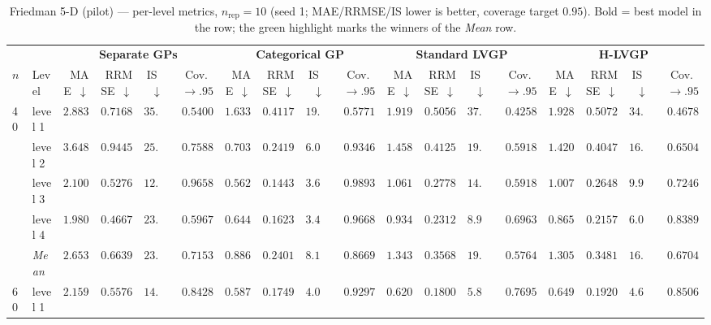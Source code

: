 \begin{table}[htbp]
\centering
\scriptsize
\setlength{\tabcolsep}{2.5pt}
\setlength{\fboxsep}{1pt}
\caption{Friedman 5-D (pilot) --- per-level metrics, $n_{\mathrm{rep}}=10$ (seed 1; MAE/RRMSE/IS lower is better, coverage target $0.95$). Bold = best model in the row; the green highlight marks the winners of the \emph{Mean} row.}
\label{tab:friedman_5d_nrep10}
\begin{tabular}{llrrrrrrrrrrrrrrrr}
\toprule
 & & \multicolumn{4}{c}{\textbf{Separate GPs}} & \multicolumn{4}{c}{\textbf{Categorical GP}} & \multicolumn{4}{c}{\textbf{Standard LVGP}} & \multicolumn{4}{c}{\textbf{H-LVGP}} \\
\cmidrule(lr){3-6} \cmidrule(lr){7-10} \cmidrule(lr){11-14} \cmidrule(lr){15-18}
$n$ & Level & MAE~$\downarrow$ & RRMSE~$\downarrow$ & IS~$\downarrow$ & Cov.~$\to.95$ & MAE~$\downarrow$ & RRMSE~$\downarrow$ & IS~$\downarrow$ & Cov.~$\to.95$ & MAE~$\downarrow$ & RRMSE~$\downarrow$ & IS~$\downarrow$ & Cov.~$\to.95$ & MAE~$\downarrow$ & RRMSE~$\downarrow$ & IS~$\downarrow$ & Cov.~$\to.95$ \\
\midrule
\multirow{5}{*}{40} & level 1 & $2.883$ & $0.7168$ & $35.53$ & $0.5400$ & {\boldmath$1.633$} & {\boldmath$0.4117$} & {\boldmath$19.32$} & {\boldmath$0.5771$} & $1.919$ & $0.5056$ & $37.19$ & $0.4258$ & $1.928$ & $0.5072$ & $34.30$ & $0.4678$ \\
 & level 2 & $3.648$ & $0.9445$ & $25.21$ & $0.7588$ & {\boldmath$0.7032$} & {\boldmath$0.2419$} & {\boldmath$6.049$} & {\boldmath$0.9346$} & $1.458$ & $0.4125$ & $19.22$ & $0.5918$ & $1.420$ & $0.4047$ & $16.31$ & $0.6504$ \\
 & level 3 & $2.100$ & $0.5276$ & $12.06$ & {\boldmath$0.9658$} & {\boldmath$0.5622$} & {\boldmath$0.1443$} & {\boldmath$3.628$} & $0.9893$ & $1.061$ & $0.2778$ & $14.27$ & $0.5918$ & $1.007$ & $0.2648$ & $9.959$ & $0.7246$ \\
 & level 4 & $1.980$ & $0.4667$ & $23.02$ & $0.5967$ & {\boldmath$0.6449$} & {\boldmath$0.1623$} & {\boldmath$3.434$} & {\boldmath$0.9668$} & $0.9341$ & $0.2312$ & $8.987$ & $0.6963$ & $0.8655$ & $0.2157$ & $6.081$ & $0.8389$ \\
 & \textit{Mean} & $2.653$ & $0.6639$ & $23.95$ & $0.7153$ & \colorbox{green!20}{\boldmath$0.8860$} & \colorbox{green!20}{\boldmath$0.2401$} & \colorbox{green!20}{\boldmath$8.108$} & \colorbox{green!20}{\boldmath$0.8669$} & $1.343$ & $0.3568$ & $19.92$ & $0.5764$ & $1.305$ & $0.3481$ & $16.66$ & $0.6704$ \\
\midrule
\multirow{5}{*}{60} & level 1 & $2.159$ & $0.5576$ & $14.19$ & $0.8428$ & {\boldmath$0.5879$} & {\boldmath$0.1749$} & {\boldmath$4.084$} & {\boldmath$0.9297$} & $0.6205$ & $0.1800$ & $5.883$ & $0.7695$ & $0.6499$ & $0.1920$ & $4.671$ & $0.8506$ \\

\end{tabular}
\end{table}
